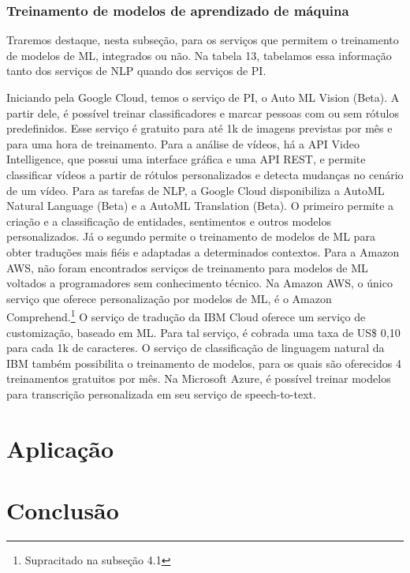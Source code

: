 \documentclass{article}
\begin{document}
\subsubsection{Treinamento de modelos de aprendizado de máquina}
Traremos destaque, nesta subseção, para os serviços que permitem o treinamento de modelos de ML, integrados ou não. Na tabela 13, tabelamos essa informação tanto dos serviços de NLP quando dos serviços de PI.

Iniciando pela Google Cloud, temos o serviço de PI, o Auto ML Vision (Beta). A partir dele, é possível treinar classificadores e marcar pessoas com ou sem rótulos predefinidos. Esse serviço é gratuito para até 1k de imagens previstas por mês e para uma hora de treinamento. Para a análise de vídeos, há a API Video Intelligence, que possui uma interface gráfica e uma API REST, e permite classificar vídeos a partir de rótulos personalizados e detecta mudanças no cenário de um vídeo. Para as tarefas de NLP, a Google Cloud disponibiliza a AutoML Natural Language (Beta) e a AutoML Translation (Beta). O primeiro permite a criação e a classificação de entidades, sentimentos e outros modelos personalizados. Já o segundo permite o treinamento de modelos de ML para obter traduções mais fiéis e adaptadas a determinados contextos. Para a Amazon AWS, não foram encontrados serviços de treinamento para modelos de ML voltados a programadores sem conhecimento técnico. Na Amazon AWS, o único serviço que oferece personalização por modelos de ML, é o Amazon Comprehend.\footnote{Supracitado na subseção 4.1}
O serviço de tradução da IBM Cloud oferece um serviço de customização, baseado em ML. Para tal serviço, é cobrada uma taxa de US\$ 0,10 para cada 1k de caracteres. O serviço de classificação de linguagem natural da IBM também possibilita o treinamento de modelos, para os quais são oferecidos 4 treinamentos gratuitos por mês. Na Microsoft Azure, é possível treinar modelos para transcrição personalizada em seu serviço de speech-to-text.

\section{Aplicação}

\section{Conclusão}
\label{sec:headings}

\medskip



%   
\end{document}

